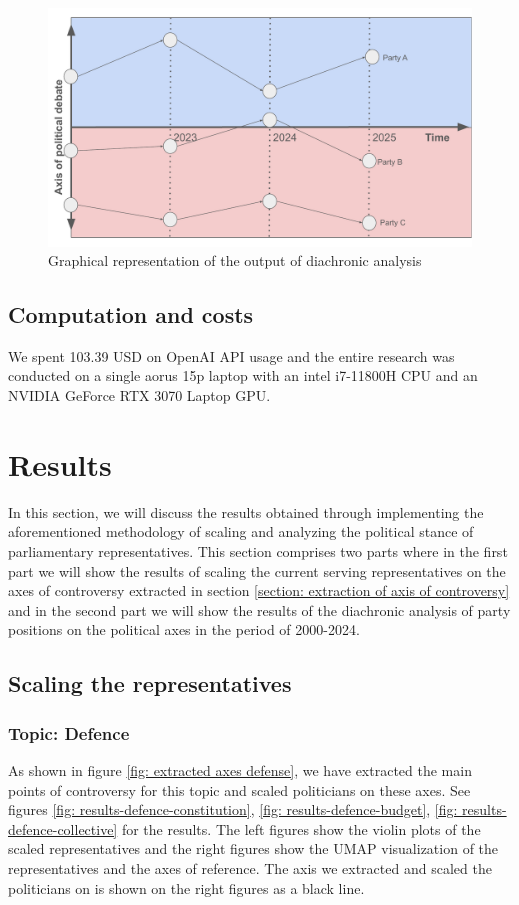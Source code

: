 \documentclass[final,5p,times,twocolumn,authoryear]{elsarticle}
\begin{document}
\begin{figure}[h]
	\centering
	  \centering
	  \includegraphics[width=1\linewidth]{figs/diachronic vis.pdf}
	  \caption{Graphical representation of the output of diachronic analysis}
	  \label{fig:diachronic}
\end{figure}

\subsection{Computation and costs}
We spent 103.39 USD on OpenAI API usage and the entire research was conducted on a single aorus 15p laptop with an intel i7-11800H CPU and an NVIDIA GeForce RTX 3070 Laptop GPU. 

\FloatBarrier

\section{Results}
\label{section:results}
In this section, we will discuss the results obtained through implementing the aforementioned methodology of scaling and analyzing the political stance of parliamentary representatives. This section comprises two parts where in the first part we will show the results of scaling the current serving representatives on the axes of controversy extracted in section \ref{section: extraction of axis of controversy} and in the second part we will show the results of the diachronic analysis of party positions on the political axes in the period of 2000-2024.

\subsection{Scaling the representatives}
\subsubsection{Topic: Defence}
As shown in figure \ref{fig: extracted axes defense}, we have extracted the main points of controversy for this topic and scaled politicians on these axes. See figures \ref{fig: results-defence-constitution}, \ref{fig: results-defence-budget}, \ref{fig: results-defence-collective} for the results. The left figures show the violin plots of the scaled representatives and the right figures show the UMAP visualization of the representatives and the axes of reference. The axis we extracted and scaled the politicians on is shown on the right figures as a black line. 
\end{document}
